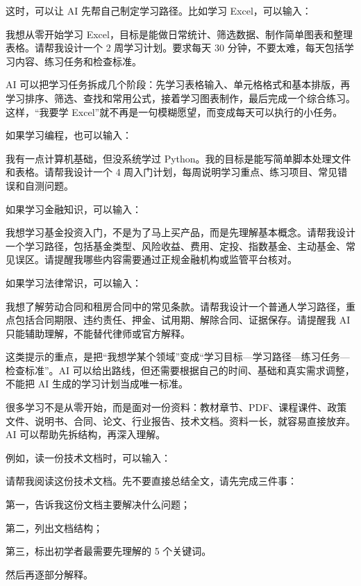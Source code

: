 这时，可以让 AI 先帮自己制定学习路径。比如学习 Excel，可以输入：

\begin{tcolorbox}[promptbox]
我想从零开始学习 Excel，目标是能做日常统计、筛选数据、制作简单图表和整理表格。请帮我设计一个 2 周学习计划。要求每天 30 分钟，不要太难，每天包括学习内容、练习任务和检查标准。
\end{tcolorbox}

AI 可以把学习任务拆成几个阶段：先学习表格输入、单元格格式和基本排版，再学习排序、筛选、查找和常用公式，接着学习图表制作，最后完成一个综合练习。这样，“我要学 Excel”就不再是一句模糊愿望，而变成每天可以执行的小任务。

如果学习编程，也可以输入：

\begin{tcolorbox}[promptbox]
我有一点计算机基础，但没系统学过 Python。我的目标是能写简单脚本处理文件和表格。请帮我设计一个 4 周入门计划，每周说明学习重点、练习项目、常见错误和自测问题。
\end{tcolorbox}

如果学习金融知识，可以输入：

\begin{tcolorbox}[promptbox]
我想学习基金投资入门，不是为了马上买产品，而是先理解基本概念。请帮我设计一个学习路径，包括基金类型、风险收益、费用、定投、指数基金、主动基金、常见误区。请提醒我哪些内容需要通过正规金融机构或监管平台核对。
\end{tcolorbox}

如果学习法律常识，可以输入：

\begin{tcolorbox}[promptbox]
我想了解劳动合同和租房合同中的常见条款。请帮我设计一个普通人学习路径，重点包括合同期限、违约责任、押金、试用期、解除合同、证据保存。请提醒我 AI 只能辅助理解，不能替代律师或官方解释。
\end{tcolorbox}

这类提示的重点，是把“我想学某个领域”变成“学习目标—学习路径—练习任务—检查标准”。AI 可以给出路线，但还需要根据自己的时间、基础和真实需求调整，不能把 AI 生成的学习计划当成唯一标准。


很多学习不是从零开始，而是面对一份资料：教材章节、PDF、课程课件、政策文件、说明书、合同、论文、行业报告、技术文档。资料一长，就容易直接放弃。AI 可以帮助先拆结构，再深入理解。

例如，读一份技术文档时，可以输入：

\begin{tcolorbox}[promptbox]
请帮我阅读这份技术文档。先不要直接总结全文，请先完成三件事：

第一，告诉我这份文档主要解决什么问题；

第二，列出文档结构；

第三，标出初学者最需要先理解的 5 个关键词。

然后再逐部分解释。
\end{tcolorbox}

